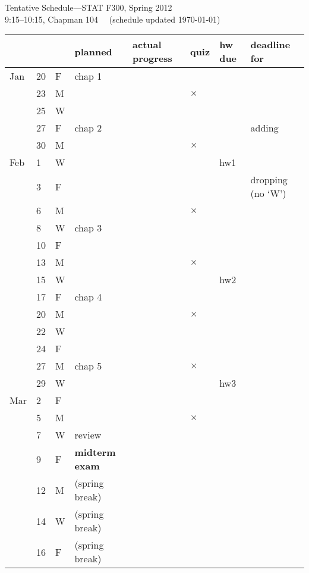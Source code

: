 \documentclass{article}
\begin{document}
\begin{center}
{\Large Tentative Schedule---STAT F300, Spring 2012}\\[2mm]
9:15--10:15, Chapman 104 \ \ (schedule updated \today)
\end{center}
\medskip
\thispagestyle{empty}

\renewcommand\arraystretch{1.06}

\hskip-6mm
\begin{tabular*}{0.99\textwidth}{%
    p{}%
    p{}%
    p{}%
    |p{}%
    |p{}%
    |p{}%
    |p{}%
    |p{}}
\hline
& & & planned& actual progress& quiz &hw due& deadline for\\
\hline
Jan
& 20 & F & chap 1& & & & \\
\hline
& 23 & M & & & $\times$& &\\
& 25 & W & & & & &\\
& 27 & F & chap 2& & & &{\small adding}\\
\hline
& 30 & M & & & $\times$ & &\\
Feb
& 1  & W & & & & hw1&\\
& 3  & F & & & & &{\small dropping (no `W')}\\
\hline
& 6  & M & & &$\times$& & \\
& 8  & W & chap 3& & & &\\
& 10  & F & & & & & \\
\hline
& 13 & M & & &$\times$ & &\\
& 15 & W & & & & hw2&\\
& 17 & F & chap 4& & & &\\
\hline
& 20 & M & & &$\times$ & & \\
& 22 & W & & & & &\\
& 24 & F & & & & & \\
\hline
& 27 & M & chap 5& &$\times$ & &\\
& 29 & W & & & & hw3&\\
Mar
& 2  & F & & & & & \\
\hline
& 5  & M & & &$\times$ & & \\
& 7  & W & review & & & &\\
& 9  & F & \textbf{midterm exam}& & & & \\
\hline
& 12 & M & (spring break) & & &\\
& 14 & W & (spring break) & & &\\
& 16 & F & (spring break) & & &\\

\end{tabular*}
\end{document}
